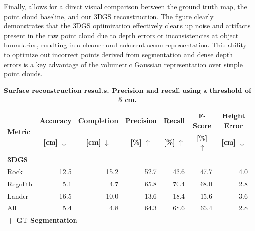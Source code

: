 Finally,  allows for a direct visual comparison between the ground truth map, the point cloud baseline, and our 3DGS reconstruction. The figure clearly demonstrates that the 3DGS optimization effectively cleans up noise and artifacts present in the raw point cloud due to depth errors or inconsistencies at object boundaries, resulting in a cleaner and coherent scene representation. This ability to optimize out incorrect points derived from segmentation and dense depth errors is a key advantage of the volumetric Gaussian representation over simple point clouds.

\begin{table}[h]
	\centering
	\small
	\caption{\bfseries Surface reconstruction results. Precision and recall using a threshold of 5 cm.}
	\label{tab:surface_reconstruction}
	\begin{tabular}[t]{|lrrrrrr|}
		\hline
		\multirow{2}{*}{\textbf{Metric}}               &
		\multicolumn{1}{c}{\textbf{Accuracy}}          &
		\multicolumn{1}{c}{\textbf{Completion}}        &
		\multicolumn{1}{c}{\textbf{Precision}}         &
		\multicolumn{1}{c}{\textbf{Recall}}            &
		\multicolumn{1}{c}{\textbf{F-Score}}           &
		\multicolumn{1}{c|}{\textbf{Height Error}}
		\\
		\multicolumn{1}{|c}{}                          &
		\multicolumn{1}{c}{\textbf{[cm] $\downarrow$}} &
		\multicolumn{1}{c}{\textbf{[cm] $\downarrow$}} &
		\multicolumn{1}{c}{\textbf{[\%] $\uparrow$}}   &
		\multicolumn{1}{c}{\textbf{[\%] $\uparrow$}}   &
		\multicolumn{1}{c}{\textbf{[\%] $\uparrow$}}   &
		\multicolumn{1}{c|}{\textbf{[cm] $\downarrow$}}                                           \\ \hline\hline
		\multicolumn{7}{|l|}{\textbf{3DGS}}                                                       \\ \hline
		Rock                                           & 12.5  & 15.2 & 52.7 & 43.6 & 47.7 & 4.0  \\
		Regolith                                       & 5.1   & 4.7  & 65.8 & 70.4 & 68.0 & 2.8  \\
		Lander                                         & 16.5  & 10.0 & 13.6 & 18.4 & 15.6 & 3.6  \\
		All                                            & 5.4   & 4.8  & 64.3 & 68.6 & 66.4 & 2.8  \\
		\hline
		\multicolumn{7}{|l|}{\textbf{+ GT Segmentation}}                                          \\ \hline

\end{tabular}
\end{table}

